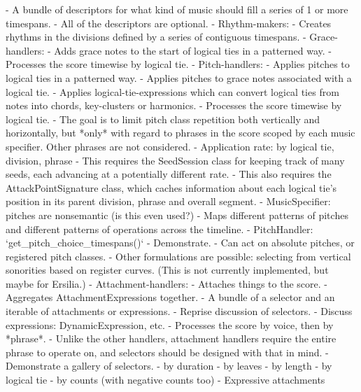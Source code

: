 \begin{markdown}
-   A bundle of descriptors for what kind of music should fill a series of
    1 or more timespans.
-   All of the descriptors are optional.
-   Rhythm-makers:
    -   Creates rhythms in the divisions defined by a series of contiguous
        timespans.
-   Grace-handlers:
    -   Adds grace notes to the start of logical ties in a patterned way.
    -   Processes the score timewise by logical tie.
-   Pitch-handlers:
    -   Applies pitches to logical ties in a patterned way.
    -   Applies pitches to grace notes associated with a logical tie.
    -   Applies logical-tie-expressions which can convert logical ties from
        notes into chords, key-clusters or harmonics.
    -   Processes the score timewise by logical tie.
        -   The goal is to limit pitch class repetition both vertically and
            horizontally, but *only* with regard to phrases in the score scoped
            by each music specifier. Other phrases are not considered.
    -   Application rate: by logical tie, division, phrase
        -   This requires the SeedSession class for keeping track of many
            seeds, each advancing at a potentially different rate.
        -   This also requires the AttackPointSignature class, which caches
            information about each logical tie's position in its parent
            division, phrase and overall segment.
    -   MusicSpecifier: pitches are nonsemantic (is this even used?)
    -   Maps different patterns of pitches and different patterns of operations
        across the timeline.
        -   PitchHandler: `get_pitch_choice_timespans()`
        -   Demonstrate.
    -   Can act on absolute pitches, or registered pitch classes.
    -   Other formulations are possible: selecting from vertical sonorities
        based on register curves. (This is not currently implemented, but maybe
        for Ersilia.)
-   Attachment-handlers:
    -   Attaches things to the score.
    -   Aggregates AttachmentExpressions together.
        -   A bundle of a selector and an iterable of attachments or
            expressions.
        -   Reprise discussion of selectors.
        -   Discuss expressions: DynamicExpression, etc.
    -   Processes the score by voice, then by *phrase*.
        -   Unlike the other handlers, attachment handlers require the entire
            phrase to operate on, and selectors should be designed with that in
            mind.
    -   Demonstrate a gallery of selectors.
        -   by duration
        -   by leaves
        -   by length
        -   by logical tie
        -   by counts (with negative counts too)
    -   Expressive attachments

\end{markdown}
